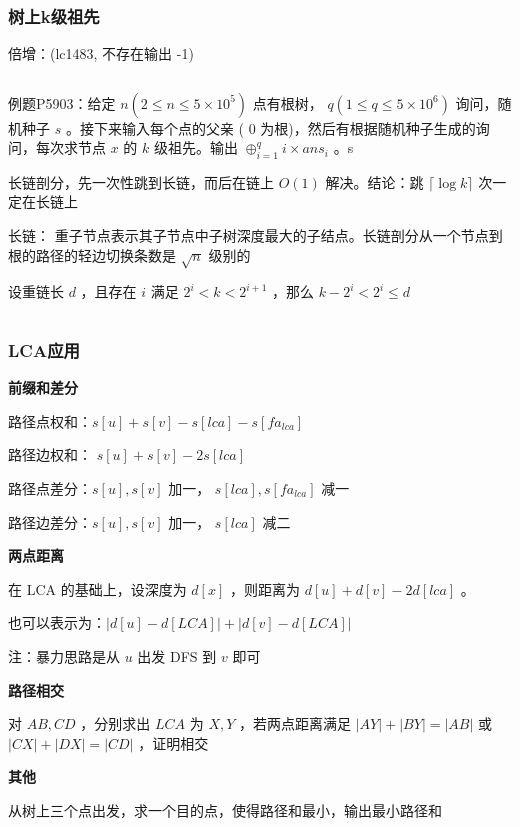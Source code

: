 \documentclass[twocolumn,10pt]{ctexart}
\makeatletter
\newcommand{\hfive}[1]{\par\addvspace{6pt}\@afterindentfalse
  {\noindent\bfseries\normalsize #1}\par\nobreak\vspace{2pt}}
\makeatother
\begin{document}
\subsubsection{树上k级祖先}

倍增：(lc1483, 不存在输出 -1)

\inputminted{cpp}{code/ext_030.cpp}

\begin{notebox}
例题P5903：给定 $n(2\le n\le5\times10^5)$ 点有根树， $q(1\le q\le5\times10^6)$ 询问，随机种子 $s$ 。接下来输入每个点的父亲 ( $0$ 为根)，然后有根据随机种子生成的询问，每次求节点 $x$ 的 $k$ 级祖先。输出 $\oplus_{i=1}^qi\times ans_i$ 。s
\end{notebox}

长链剖分，先一次性跳到长链，而后在链上 $O(1)$ 解决。结论：跳 $\lceil\log k\rceil$ 次一定在长链上

长链： 重子节点表示其子节点中子树深度最大的子结点。长链剖分从一个节点到根的路径的轻边切换条数是 $\sqrt n$ 级别的

设重链长 $d$ ，且存在 $i$ 满足 $2^i < k < 2^{i+1}$ ，那么 $k-2^i < 2^i\le d$

\inputminted{cpp}{code/p5903_k_ancestor.cpp}

\subsubsection{LCA应用}

\hfive{前缀和差分}

路径点权和：$s[u]+s[v]-s[lca]-s[fa_{lca}]$

路径边权和： $s[u]+s[v]-2s[lca]$

路径点差分：$s[u],s[v]$ 加一， $s[lca],s[fa_{lca}]$ 减一

路径边差分：$s[u],s[v]$ 加一， $s[lca]$ 减二

\hfive{两点距离}

在 LCA 的基础上，设深度为 $d[x]$ ，则距离为 $d[u]+d[v]-2d[lca]$ 。

\begin{notebox}
也可以表示为：$|d[u]-d[LCA]|+|d[v]-d[LCA]|$

注：暴力思路是从 $u$ 出发 DFS 到 $v$ 即可
\end{notebox}

\hfive{路径相交}

对 $AB,CD$ ，分别求出 $LCA$ 为 $X,Y$ ，若两点距离满足 $|AY|+|BY|=|AB|$ 或 $|CX|+|DX|=|CD|$ ，证明相交

\hfive{其他}

从树上三个点出发，求一个目的点，使得路径和最小，输出最小路径和
\end{document}
